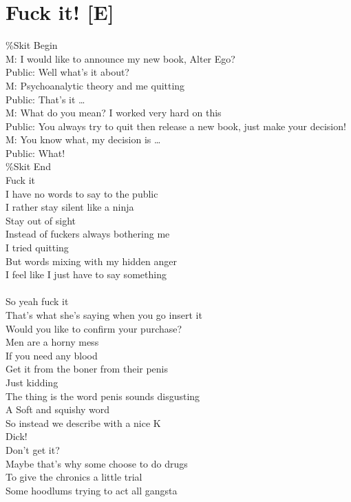 \documentclass[12pt, b5paper, oneside]{book}
\begin{document}
\section{Fuck it! [E]}
\%Skit Begin 
\\M: I would like to announce my new book, Alter Ego?
\\Public: Well what's it about?
\\M: Psychoanalytic theory and me quitting
\\Public: That's it \dots 
\\M: What do you mean? I worked very hard on this
\\Public: You always try to quit then release a new book, just make your decision!
\\M: You know what, my decision is \dots 
\\Public: What! 
\\\%Skit End
\\Fuck it
\\I have no words to say to the public
\\I rather stay silent like a ninja
\\Stay out of sight
\\Instead of fuckers always bothering me
\\I tried quitting
\\But words mixing with my hidden anger
\\I feel like I just have to say something
%
\\\\So yeah fuck it
\\That's what she's saying when you go insert it
\\Would you like to confirm your purchase?
\\Men are a horny mess
\\If you need any blood
\\Get it from the boner from their penis
\\Just kidding
\\The thing is the word penis sounds disgusting
\\A Soft and squishy word
\\So instead we describe with a nice K
\\Dick!
\\Don't get it?
\\Maybe that's why some choose to do drugs
\\To give the chronics a little trial
\\Some hoodlums trying to act all gangsta
\end{document}
